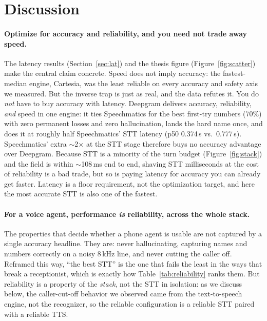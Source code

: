 \documentclass[11pt]{article}
\begin{document}
\section{Discussion}
\label{sec:disc}

\paragraph{Optimize for accuracy and reliability, and you need not trade away
speed.}
The latency results (Section~\ref{sec:lat}) and the thesis figure
(Figure~\ref{fig:scatter}) make the central claim concrete. Speed does not imply
accuracy: the fastest-median engine, Cartesia, was the least reliable on every
accuracy and safety axis we measured. But the inverse trap is just as real, and
the data refutes it. You do \emph{not} have to buy accuracy with latency.
Deepgram delivers accuracy, reliability, \emph{and} speed in one engine: it ties
Speechmatics for the best first-try numbers (70\%) with zero permanent losses
and zero hallucination, lands the hard name once, and does it at roughly half
Speechmatics' STT latency (p50 0.374\,s vs.\ 0.777\,s). Speechmatics' extra
$\sim$2$\times$ at the STT stage therefore buys no accuracy advantage over
Deepgram. Because STT is a minority of the turn budget
(Figure~\ref{fig:stack}) and the field is within $\sim$108\,ms end to end,
shaving STT milliseconds at the cost of reliability is a bad trade, but so is
paying latency for accuracy you can already get faster. Latency is a floor
requirement, not the optimization target, and here the most accurate STT is also
one of the fastest.

\paragraph{For a voice agent, performance \emph{is} reliability, across the whole
stack.}
The properties that decide whether a phone agent is usable are not captured by a
single accuracy headline. They are: never hallucinating, capturing names and
numbers correctly on a noisy 8\,kHz line, and never cutting the caller off.
Reframed this way, ``the best STT'' is the one that fails the least in the ways
that break a receptionist, which is exactly how Table~\ref{tab:reliability}
ranks them. But reliability is a property of the \emph{stack}, not the STT in
isolation: as we discuss below, the caller-cut-off behavior we observed came
from the text-to-speech engine, not the recognizer, so the reliable
configuration is a reliable STT paired with a reliable TTS.
\end{document}
